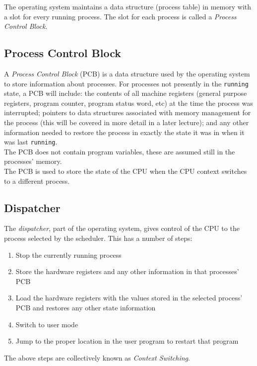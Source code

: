 The operating system maintains a data structure (process table) in memory with a slot for every running process. The slot for each process is called a \textit{Process Control Block}.

\subsection{Process Control Block}
A \textit{Process Control Block} (PCB) is a data structure used by the operating system to store information about processes. For processes not presently in the \verb|running| state, a PCB will include: the contents of all machine registers (general purpose registers, program counter, program status word, etc) at the time the process was interrupted; pointers to data structures associated with memory management for the process (this will be covered in more detail in a later lecture); and any other information needed to restore the process in exactly the state it was in when it was last \verb|running|.\\

The PCB does not contain program variables, these are assumed still in the processes' memory.\\

The PCB is used to store the state of the CPU when the CPU context switches to a different process. 

\subsection{Dispatcher}
The \textit{dispatcher}, part of the operating system, gives control of the CPU to the process selected by the scheduler. This has a number of steps:

\begin{enumerate}
    \item Stop the currently running process
    \item Store the hardware registers and any other information in that processes' PCB
    \item Load the hardware registers with the values stored in the selected process' PCB and restores any other state information
    \item Switch to user mode
    \item Jump to the proper location in the user program to restart that program
\end{enumerate}

The above steps are collectively known as \textit{Context Switching}.